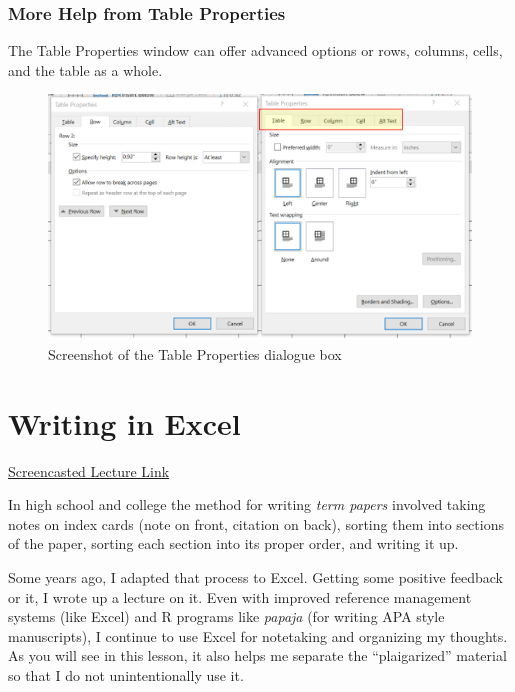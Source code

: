 \documentclass[
  english,
]{book}
\begin{document}
\hypertarget{more-help-from-table-properties}{%
\subsection{More Help from Table Properties}\label{more-help-from-table-properties}}

The Table Properties window can offer advanced options or rows, columns, cells, and the table as a whole.

\begin{figure}
\centering
\includegraphics{images/TableMagic/TableProperties.png}
\caption{Screenshot of the Table Properties dialogue box}
\end{figure}

\hypertarget{Excel}{%
\chapter{Writing in Excel}\label{Excel}}

\href{HTTPS://SPU.HOSTED.PANOPTO.COM/PANOPTO/PAGES/VIEWER.ASPX?PID=DA5981E8-39FF-4E2D-A940-AAD3013C5A19}{Screencasted Lecture Link}

In high school and college the method for writing \emph{term papers} involved taking notes on index cards (note on front, citation on back), sorting them into sections of the paper, sorting each section into its proper order, and writing it up.

Some years ago, I adapted that process to Excel. Getting some positive feedback or it, I wrote up a lecture on it. Even with improved reference management systems (like Excel) and R programs like \emph{papaja} (for writing APA style manuscripts), I continue to use Excel for notetaking and organizing my thoughts. As you will see in this lesson, it also helps me separate the ``plaigarized'' material so that I do not unintentionally use it.
\end{document}
